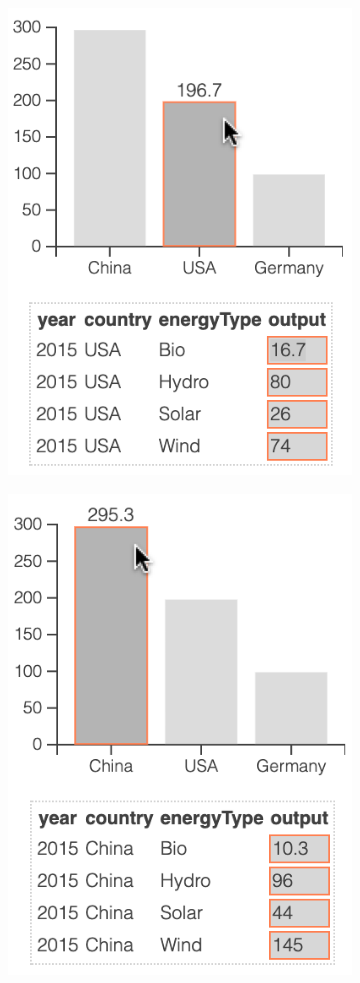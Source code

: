 \begin{figure}[H]
   \begin{subfigure}{0.45\textwidth}
      \centering
      {\includegraphics[scale=0.3]{fig/example/data-linking-1.png}}
   \end{subfigure}
   \begin{subfigure}{0.45\textwidth}
      \centering
      {\includegraphics[scale=0.3]{fig/example/data-linking-2.png}}

\end{subfigure}
\end{figure}
